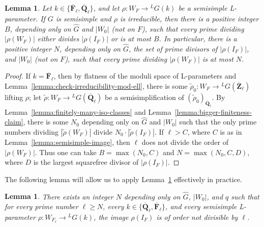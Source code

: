 \documentclass[reqno]{amsart}
\numberwithin{equation}{subsection}
\newcommand{\F}{\mathbf{F}}
\newcommand{\wt}[1]{\widetilde{#1}}
\newcommand{\Q}{\mathbf{Q}}
\newcommand{\Z}{\mathbf{Z}}
\newcommand{\ol}[1]{\overline{#1}}
\newcommand{\wh}[1]{\widehat{#1}}
\newcommand{\co}{\colon}
\newcommand{\ld}{{}^L}
\newtheorem{lemma}[thm]{Lemma}
\theoremstyle{remark}
\numberwithin{equation}{subsection}
\numberwithin{figure}{subsection}
\begin{document}
\begin{lemma}\label{lem:semisimple-finite-image}
Let $k \in \{\ol{\F}_\ell, \ol{\Q}_\ell\}$, and let $\rho\colon W_F \to \ld G(k)$ be a semisimple L-parameter. If $G$ is semisimple and $\rho$ is irreducible, then there is a positive integer $B$, depending only on $\widehat{G}$ and $|W_0|$ (not on $F$), such that every prime dividing $|\rho(W_F)|$ either divides $|\rho(I_F)|$ or is at most $B$. In particular, there is a positive integer $N$, depending only on $\widehat{G}$, the set of prime divisors of $|\rho(I_F)|$, and $|W_0|$ (not on $F$), such that every prime dividing $|\rho(W_F)|$ is at most $N$.
\end{lemma}

\begin{proof}
If $k = \ol\F_\ell$, then by flatness of the moduli space of L-parameters \cite[Theorem 4.1 i)]{DHKM25} and Lemma~\ref{lemma:check-irreducibility-mod-ell}, there is some $\wt\rho_0\co W_F \to \ld G(\ol\Z_\ell)$ lifting $\rho$; let $\wt\rho\co W_F \to \ld G(\ol\Q_\ell)$ be a semisimplification of $(\wt\rho_0)_{\ol\Q_\ell}$. By Lemma~\ref{lemma:finitely-many-iso-classes} and Lemma~\ref{lemma:bigger-finiteness-claim}, there is some $N_0$ depending only on $\wh G$ and $|W_0|$ such that the only prime numbers dividing $|\wt\rho(W_F)|$ divide $N_0 \cdot |\wt\rho(I_F)|$. If $\ell > C$, where $C$ is as in Lemma~\ref{lemma:semisimple-image}, then $\ell$ does not divide the order of $|\rho(W_F)|$. Thus one can take $B = \max(N_0, C)$ and $N = \max(N_0, C, D)$, where $D$ is the largest squarefree divisor of $|\rho(I_F)|$.
\end{proof}

The following lemma will allow us to apply Lemma~\ref{lem:semisimple-finite-image} effectively in practice.

\begin{lemma}\label{lemma:inertia-order}
There exists an integer $N$ depending only on $\widehat{G}$, $|W_0|$, and $q$ such that for every prime number $\ell\geq N$, every $k\in\{\ol\Q_\ell,\ol\F_\ell\}$, and every semisimple L-parameter $\rho\colon W_{F_\ell}\to\ld G(k)$, the image $\rho(I_F)$ is of order not divisible by $\ell$.
\end{lemma}
\end{document}
